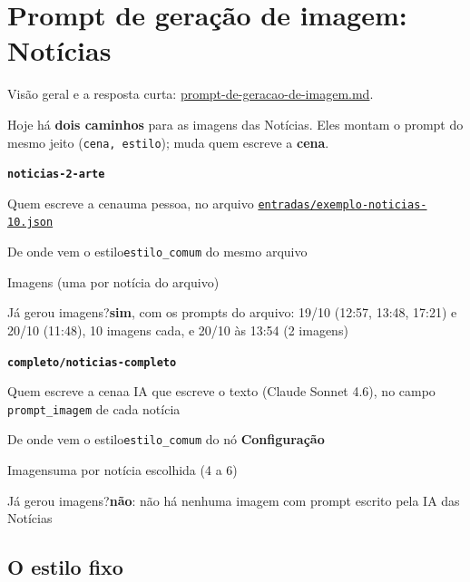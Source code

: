 
\section{Prompt de geração de imagem: Notícias}\label{sec:noticias}

Visão geral e a resposta curta: \hyperref[sec:visao-geral]{prompt-de-geracao-de-imagem.md}.

Hoje há \textbf{dois caminhos} para as imagens das Notícias. Eles montam o prompt do mesmo jeito (\texttt{cena, estilo}); muda quem escreve a \textbf{cena}.

\begin{recordbox}
{\bfseries\color{accent} \nolinkurl{noticias-2-arte}}\par
{\small\color{muted} Quem escreve a cena}\quad uma pessoa, no arquivo \href{run:../../../entradas/exemplo-noticias-10.json}{\nolinkurl{entradas/exemplo-noticias-10.json}}\par
{\small\color{muted} De onde vem o estilo}\quad \nolinkurl{estilo_comum} do mesmo arquivo\par
{\small\color{muted} Imagens} (uma por notícia do arquivo)\par
{\small\color{muted} Já gerou imagens?}\quad \textbf{sim}, com os prompts do arquivo: 19/10 (12:57, 13:48, 17:21) e 20/10 (11:48), 10 imagens cada, e 20/10 às 13:54 (2 imagens)\par
\end{recordbox}
\begin{recordbox}
{\bfseries\color{accent} \nolinkurl{completo/noticias-completo}}\par
{\small\color{muted} Quem escreve a cena}\quad a IA que escreve o texto (Claude Sonnet 4.6), no campo \nolinkurl{prompt_imagem} de cada notícia\par
{\small\color{muted} De onde vem o estilo}\quad \nolinkurl{estilo_comum} do nó \textbf{Configuração}\par
{\small\color{muted} Imagens}\quad uma por notícia escolhida (4 a 6)\par
{\small\color{muted} Já gerou imagens?}\quad \textbf{não}: não há nenhuma imagem com prompt escrito pela IA das Notícias\par
\end{recordbox}


\subsection*{O estilo fixo}

